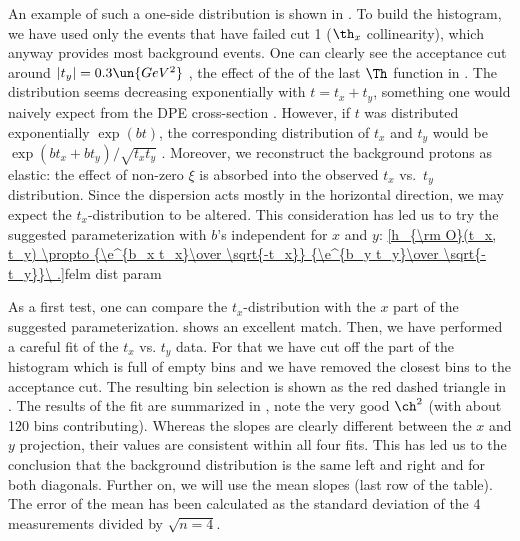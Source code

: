 \bmfig
{}
\emfig

An example of such a one-side distribution is shown in . To build the histogram, we have used only the events that have failed cut 1 ($\th_x$ collinearity), which anyway provides most background events. One can clearly see the acceptance cut around $|t_y| = 0.3\un{GeV^2}$ , the effect of the of the last $\Th$ function in . The distribution seems decreasing exponentially with $t = t_x + t_y$, something one would naively expect from the DPE cross-section . However, if $t$ was distributed exponentially $\exp(b t)$, the corresponding distribution of $t_x$ and $t_y$ would be $\exp(b t_x + b t_y)/\sqrt{t_x t_y}$
. Moreover, we reconstruct the background protons as elastic: the effect of non-zero $\xi$ is absorbed into the observed $t_x$ vs.~$t_y$ distribution. Since the dispersion acts mostly in the horizontal direction, we may expect the $t_x$-distribution to be altered. This consideration has led us to try the suggested parameterization with $b$'s independent for $x$ and $y$:
\eqref{h_{\rm O}(t_x, t_y) \propto {\e^{b_x t_x}\over \sqrt{-t_x}} {\e^{b_y t_y}\over \sqrt{-t_y}}\ .}{felm dist param}

As a first test, one can compare the $t_x$-distribution with the $x$ part of the suggested parameterization.  shows an excellent match. Then, we have performed a careful fit of the $t_x$ vs. $t_y$ data. For that we have cut off the part of the histogram which is full of empty bins and we have removed the closest bins to the acceptance cut. The resulting bin selection is shown as the red dashed triangle in . The results of the fit are summarized in , note the very good $\ch^2$ (with about 120 bins contributing). Whereas the slopes are clearly different between the $x$ and $y$ projection, their values are consistent within all four fits. This has led us to the conclusion that the background distribution is the same left and right and for both diagonals. Further on, we will use the mean slopes (last row of the table). The error of the mean has been calculated as the standard deviation of the 4 measurements divided by $\sqrt{n = 4}$.

